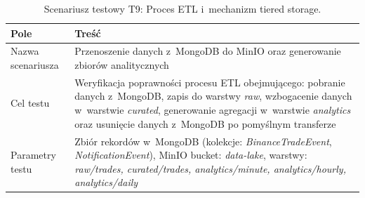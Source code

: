 \begin{table}[H]
    \centering
    \caption{Scenariusz testowy T9: Proces ETL i~mechanizm tiered storage.}
    \label{tab:test_etl_tiered_storage}
    \begin{tabular}{|p{}|p{}|}
        \hline
        \textbf{Pole}        & \textbf{Treść}                                                                                                                                                                                                                                                                                                                                                                                                                                                                                                                                             \\ \hline
        Nazwa scenariusza    & Przenoszenie danych z~MongoDB do MinIO oraz generowanie zbiorów analitycznych                                                                                                                                                                                                                                                                                                                                                                                                                                                                              \\ \hline
        Cel testu            & Weryfikacja poprawności procesu ETL obejmującego: pobranie danych z~MongoDB, zapis do warstwy \textit{raw}, wzbogacenie danych w~warstwie \textit{curated}, generowanie agregacji w~warstwie \textit{analytics} oraz usunięcie danych z~MongoDB po pomyślnym transferze                                                                                                                                                                                                                                                                                    \\ \hline
        Parametry testu      & Zbiór rekordów w~MongoDB (kolekcje: \textit{BinanceTradeEvent}, \textit{NotificationEvent}), MinIO bucket: \textit{data-lake}, warstwy: \textit{raw/trades, curated/trades, analytics/minute, analytics/hourly, analytics/daily}                                                                                                                                                                                                                                                                                                                           \\ \hline

\end{tabular}
\end{table}
